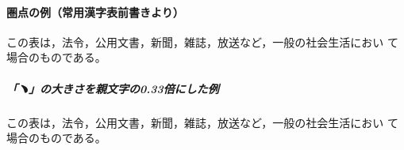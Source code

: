 \documentclass[a4paper,10ptj]{ltjsarticle}
\begin{document}
\paragraph{圏点の例（常用漢字表前書きより）}
この表は，法令，公⽤⽂書，新聞，雑誌，放送など，⼀般の社会⽣活におい%
て場合のものである。

\subparagraph{「﹅」の大きさを親文字の0.33倍にした例}
この表は，法令，公⽤⽂書，新聞，雑誌，放送など，⼀般の社会⽣活におい%
て場合のものである。
\end{document}
